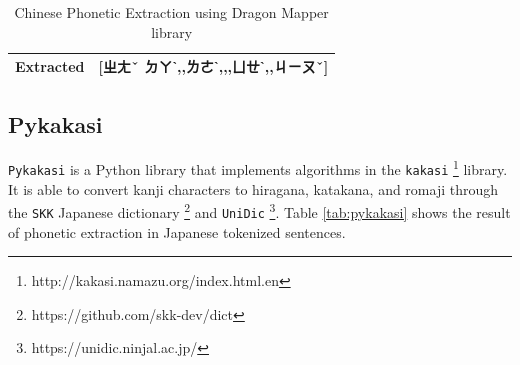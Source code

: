 \begin{table}[h]
        \begin{CJK}{UTF8}{bsmi}
        \begin{tabular}{p{2.3cm}p{12cm}}
            Extracted & [ㄓㄤˇ ㄉㄚˋ,, ㄌㄜˋ,\enspace,, ㄩㄝˋ,, ㄐㄧㄡˇ] \\\bottomrule
        \end{tabular}
        \end{CJK}

        \caption{Chinese Phonetic Extraction using Dragon Mapper library}
        \label{tab:dragonmapper}
    \end{table}

\subsection{Pykakasi} \label{sec:pykakasi}

\texttt{Pykakasi} is a Python library that implements algorithms in the \texttt{kakasi} \footnote{http://kakasi.namazu.org/index.html.en} library. It is able to convert kanji characters to hiragana, katakana, and romaji through the \texttt{SKK} Japanese dictionary \footnote{https://github.com/skk-dev/dict} and \texttt{UniDic} \footnote{https://unidic.ninjal.ac.jp/}. Table \ref{tab:pykakasi} shows the result of phonetic extraction in Japanese tokenized sentences. 

\vspace{0.2cm}

